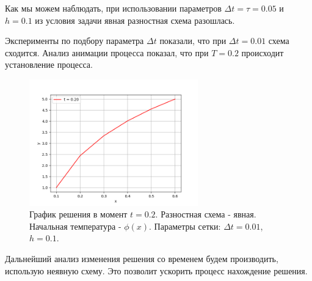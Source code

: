 \documentclass[12pt]{article}%
\begin{document}
Как мы можем наблюдать, при использовании параметров $\Delta t = \tau = 0.05$ и $h=0.1$ из условия задачи явная разностная схема разошлась. 

Эксперименты по подбору параметра $\Delta t$ показали, что при $\Delta t=0.01$ схема сходится. Анализ анимации процесса показал, что при $T=0.2$ происходит установление процесса.

\begin{figure}[H]
    \centering
    \includegraphics[width=0.65\textwidth]{explicit-stationarity.png}
    \caption{График решения в момент $t=0.2$. Разностная схема - явная. Начальная температура - $\phi(x)$. Параметры сетки: $\Delta t = 0.01$, $h=0.1$.}
\end{figure}


Дальнейший анализ изменения решения со временем будем производить, использую неявную схему. Это позволит ускорить процесс нахождение решения.
\end{document}
